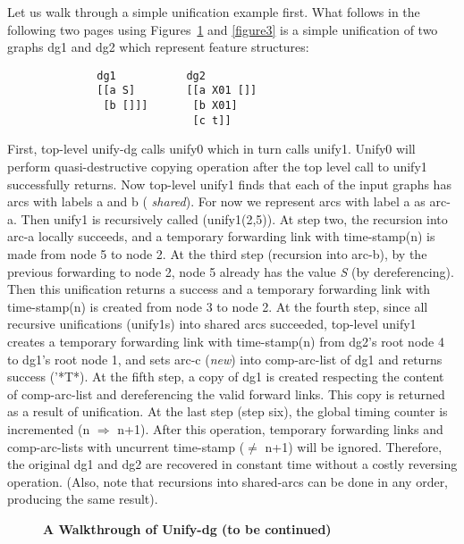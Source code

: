 Let us walk through a simple unification example first. What follows
in the following two pages using Figures~\ref{figure2} and \ref{figure3} is a simple unification of two
graphs dg1 and dg2 which represent feature structures:


\begin{verbatim}
              dg1           dg2  
              [[a S]        [[a X01 []]
               [b []]]       [b X01]
                             [c t]]
\end{verbatim}

First, top-level unify-dg calls unify0 which in turn calls unify1.
Unify0 will perform quasi-destructive copying operation after the top
level call to unify1 successfully returns.  Now top-level unify1 finds
that each of the input graphs has arcs with labels a and b ({\it
shared}).  For now we represent arcs with label a as arc-a.  Then
unify1 is recursively called (unify1(2,5)). At step two, the recursion
into arc-a locally succeeds, and a temporary forwarding link with
time-stamp(n) is made from node 5 to node 2.  At the third step
(recursion into arc-b), by the previous forwarding to node 2, node 5
already has the value {\it S} (by dereferencing).  Then this
unification returns a success and a temporary forwarding link with
time-stamp(n) is created from node 3 to node 2.  At the fourth step,
since all recursive unifications (unify1s) into shared arcs succeeded,
top-level unify1 creates a temporary forwarding link with
time-stamp(n) from dg2's root node 4 to dg1's root node 1, and sets
arc-c ({\it new}) into comp-arc-list of dg1 and returns success
('*T*). At the fifth step, a copy of dg1 is created respecting the
content of comp-arc-list and dereferencing the valid forward links.
This copy is returned as a result of unification. At the last step
(step six), the global timing counter is incremented (n $\Rightarrow$
n+1). After this operation, temporary forwarding links and
comp-arc-lists with uncurrent time-stamp ($\neq$ n+1) will be ignored.
Therefore, the original dg1 and dg2 are recovered in constant time
without a costly reversing operation.  (Also, note
that recursions into shared-arcs can be done in any order, producing
the same result).

\begin{figure}[htb] 
\hspace{-1.2cm}
\caption{{\bf A Walkthrough of Unify-dg (to be continued)}} 
\label{figure2}
\end{figure} 

